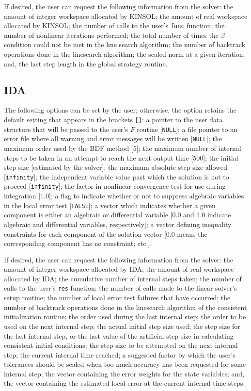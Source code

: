 If desired, the user can request the following information from the
solver: the amount of integer workspace allocated by KINSOL; the
amount of real workspace allocated by KINSOL; the number of calls to
the user's {\tt func} function; the number of nonlinear iterations
performed; the total number of times the $\beta$ condition could not
be met in the line search algorithm; the number of backtrack
operations done in the linesearch algorithm; the scaled norm at a
given iteration; and, the last step length in the global strategy
routine.

\subsection{IDA}

The following options can be set by the user; otherwise, the option
retains the default setting that appears in the brackets {\tt []}:
a pointer to the user data structure that will be passed to the user's
$F$ routine [{\tt NULL}]; a file pointer to an error file where
all warning and error messages will be written [{\tt NULL}]; the
maximum order used by the BDF method [5]; the maximum number of
internal steps to be taken in an attempt to reach the next output time
[500]; the initial step size [estimated by the solver]; the maximum
absolute step size allowed [{\tt infinity}]; the independent variable
value past which the solution is not to proceed [{\tt infinity}]; the
factor in nonlinear convergence test for use during integration [1.0];
a flag to indicate whether or not to suppress algebraic variables in
the local error test [{\tt FALSE}]; a vector which indicates whether a
given component is either an algebraic or differential variable [0.0
and 1.0 indicate algebraic and differential variables, respectively];
a vector defining inequality constraints for each component of the
solution vector [0.0 means the corresponding component has no
constraint; etc.].

If desired, the user can request the following information from the
solver: the amount of integer workspace allocated by IDA; the amount
of real workspace allocated by IDA; the cumulative number of internal
steps taken; the number of calls to the user's {\tt res} function; the
number of calls made to the linear solver's setup routine; the number
of local error test failures that have occurred; the number of
backtrack operations done in the linesearch algorithm of the
consistent initialization routine; the order used during the last
internal step; the order to be used on the next internal step; the
actual initial step size used; the step size for the last internal
step, or the last value of the artificial step size in calculating
consistent initial conditions; the step size to be attempted on the
next internal step; the current internal time reached; a suggested
factor by which the user's tolerances should be scaled when too much
accuracy has been requested for some internal step; the vector
containing the error weights for the state variables; and, the vector
containing the estimated local error at the current internal time steps.

